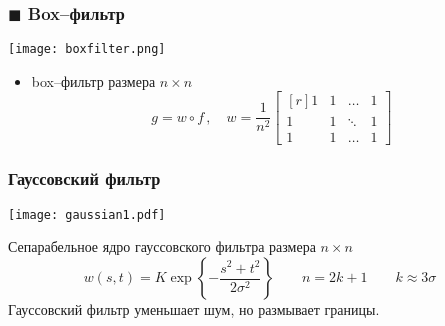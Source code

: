 \documentclass[
    12pt, 
    usepdftitle=false,
    aspectratio=1610
]{beamer}
\DeclarePairedDelimiter{\norm}{\lVert}{\rVert}
\begin{document}

\begin{frame}
    \frametitle{$\blacksquare$ Box--фильтр}
    \begin{center}
        \texttt{[image: boxfilter.png]}
    \end{center}
    
    \begin{itemize}
        \item box--фильтр размера $n\times n$
        $$
            g = w\circ f\,,\quad
            w = \frac{1}{n^2}
            \begin{bmatrix*}[r]
                1 & 1 & \ldots & 1\\
                1 & 1 & \ddots & 1\\
                1 & 1 & \ldots & 1
            \end{bmatrix*}
        $$
    \end{itemize}
\end{frame}

\begin{frame}
    \frametitle{Гауссовский фильтр}
    \begin{center}
        \texttt{[image: gaussian1.pdf]}
    \end{center}
    Сепарабельное ядро гауссовского фильтра размера $n\times n$
    $$
        w(s,t)=K\exp\left\{-\frac{s^2+t^2}{2\sigma^2}\right\}
        \qquad n=2k+1\qquad k\approx 3\sigma
    $$
    Гауссовский фильтр уменьшает шум, но размывает границы.
\end{frame}
\end{document}
